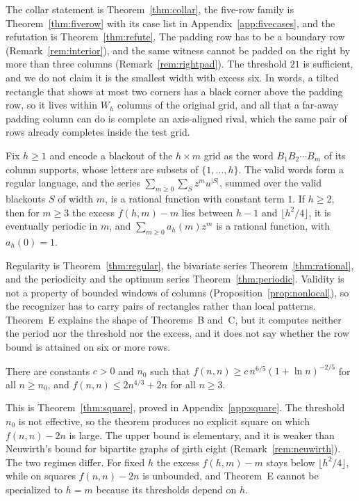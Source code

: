 The collar statement is Theorem~\ref{thm:collar}, the five-row family is
Theorem~\ref{thm:fiverow} with its case list in Appendix~\ref{app:fivecases}, and the
refutation is Theorem~\ref{thm:refute}. The padding row has to be a boundary row
(Remark~\ref{rem:interior}), and the same witness cannot be padded on the right by
more than three columns (Remark~\ref{rem:rightpad}). The threshold $21$ is sufficient,
and we do not claim it is the smallest width with excess six. In words, a tilted
rectangle that shows at most two corners has a black corner above the padding row, so
it lives within $W_h$ columns of the original grid, and all that a far-away padding
column can do is complete an axis-aligned rival, which the same pair of rows already
completes inside the test grid.

\begin{thmE}
Fix $h\ge1$ and encode a blackout of the $h\times m$ grid as the word
$B_1B_2\cdots B_m$ of its column supports, whose letters are subsets of
$\{1,\dots,h\}$. The valid words form a regular language, and the series
$\sum_{m\ge0}\sum_S z^mu^{|S|}$, summed over the valid blackouts $S$ of width $m$, is
a rational function with constant term $1$. If $h\ge2$, then for $m\ge3$ the excess
$f(h,m)-m$ lies between $h-1$ and $\lfloor h^2/4\rfloor$, it is eventually periodic
in $m$, and $\sum_{m\ge0}a_h(m)z^m$ is a rational function, with $a_h(0)=1$.
\end{thmE}

Regularity is Theorem~\ref{thm:regular}, the bivariate series
Theorem~\ref{thm:rational}, and the periodicity and the optimum series
Theorem~\ref{thm:periodic}. Validity is not a property of bounded windows of columns
(Proposition~\ref{prop:nonlocal}), so the recognizer has to carry pairs of rectangles
rather than local patterns. Theorem~E explains the shape of Theorems~B and~C, but it
computes neither the period nor the threshold nor the excess, and it does not say
whether the row bound is attained on six or more rows.

\begin{thmF}[squares]
There are constants $c>0$ and $n_0$ such that
$f(n,n)\ge c\,n^{6/5}(1+\ln n)^{-2/5}$ for all $n\ge n_0$, and
$f(n,n)\le2n^{4/3}+2n$ for all $n\ge3$.
\end{thmF}

This is Theorem~\ref{thm:square}, proved in Appendix~\ref{app:square}. The threshold
$n_0$ is not effective, so the theorem produces no explicit square on which
$f(n,n)-2n$ is large. The upper bound is elementary, and it is weaker than Neuwirth's
bound for bipartite graphs of girth eight (Remark~\ref{rem:neuwirth}). The two
regimes differ. For fixed $h$ the excess $f(h,m)-m$ stays below $\lfloor h^2/4\rfloor$,
while on squares $f(n,n)-2n$ is unbounded, and Theorem~E cannot be specialized to
$h=m$ because its thresholds depend on $h$.


